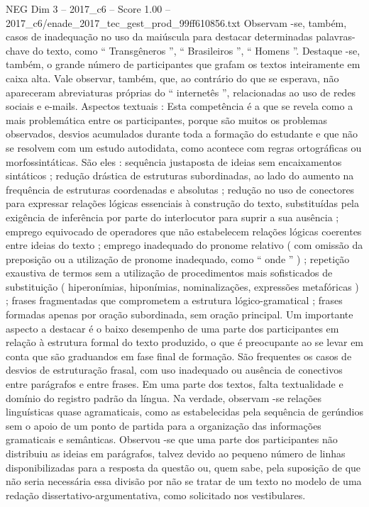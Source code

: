 \begin{textsample}{NEG Dim 3 – 2017\_c6 – Score 1.00 – 2017\_c6/enade\_2017\_tec\_gest\_prod\_99ff610856.txt}
Observam -se, também, casos de inadequação no uso da maiúscula para destacar determinadas palavras-chave do texto, como “ Transgêneros ”, “ Brasileiros ”, “ Homens ”.
Destaque -se, também, o grande número de participantes que grafam os textos inteiramente em caixa alta.
Vale observar, também, que, ao contrário do que se esperava, não apareceram abreviaturas próprias do “ internetês ”, relacionadas ao uso de redes sociais e e-mails.
Aspectos textuais : Esta competência é a que se revela como a mais problemática entre os participantes, porque são muitos os problemas observados, desvios acumulados durante toda a formação do estudante e que não se resolvem com um estudo autodidata, como acontece com regras ortográficas ou morfossintáticas.
São eles : sequência justaposta de ideias sem encaixamentos sintáticos ; redução drástica de estruturas subordinadas, ao lado do aumento na frequência de estruturas coordenadas e absolutas ; redução no uso de conectores para expressar relações lógicas essenciais à construção do texto, substituídas pela exigência de inferência por parte do interlocutor para suprir a sua ausência ; emprego equivocado de operadores que não estabelecem relações lógicas coerentes entre ideias do texto ; emprego inadequado do pronome relativo ( com omissão da preposição ou a utilização de pronome inadequado, como “ onde ” ) ; repetição exaustiva de termos sem a utilização de procedimentos mais sofisticados de substituição ( hiperonímias, hiponímias, nominalizações, expressões metafóricas ) ; frases fragmentadas que comprometem a estrutura lógico-gramatical ; frases formadas apenas por oração subordinada, sem oração principal.
Um importante aspecto a destacar é o baixo desempenho de uma parte dos participantes em relação à estrutura formal do texto produzido, o que é preocupante ao se levar em conta que são graduandos em fase final de formação.
São frequentes os casos de desvios de estruturação frasal, com uso inadequado ou ausência de conectivos entre parágrafos e entre frases.
Em uma parte dos textos, falta textualidade e domínio do registro padrão da língua.
Na verdade, observam -se relações linguísticas quase agramaticais, como as estabelecidas pela sequência de gerúndios sem o apoio de um ponto de partida para a organização das informações gramaticais e semânticas.
Observou -se que uma parte dos participantes não distribuiu as ideias em parágrafos, talvez devido ao pequeno número de linhas disponibilizadas para a resposta da questão ou, quem sabe, pela suposição de que não seria necessária essa divisão por não se tratar de um texto no modelo de uma redação dissertativo-argumentativa, como solicitado nos vestibulares.

\end{textsample}
